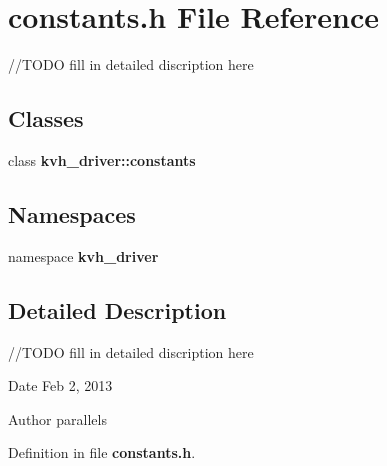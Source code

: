 \section{constants.\-h \-File \-Reference}
\label{constants_8h}


//\-T\-O\-D\-O fill in detailed discription here  


\subsection*{\-Classes}
\begin{DoxyCompactItemize}
\item 
class {\bf kvh\-\_\-driver\-::constants}
\end{DoxyCompactItemize}
\subsection*{\-Namespaces}
\begin{DoxyCompactItemize}
\item 
namespace {\bf kvh\-\_\-driver}
\end{DoxyCompactItemize}


\subsection{\-Detailed \-Description}
//\-T\-O\-D\-O fill in detailed discription here \begin{DoxyDate}{\-Date}
\-Feb 2, 2013 
\end{DoxyDate}
\begin{DoxyAuthor}{\-Author}
parallels 
\end{DoxyAuthor}


\-Definition in file {\bf constants.\-h}.

